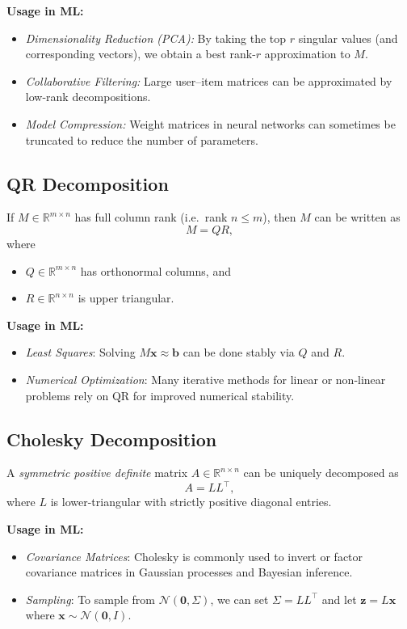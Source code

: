 \noindent
\textbf{Usage in ML:}
\begin{itemize}
    \item \emph{Dimensionality Reduction (PCA):} By taking the top $r$ singular values (and corresponding vectors), 
          we obtain a best rank-$r$ approximation to $M$.
    \item \emph{Collaborative Filtering:} Large user--item matrices can be approximated by low-rank decompositions.
    \item \emph{Model Compression:} Weight matrices in neural networks can sometimes be truncated 
          to reduce the number of parameters.
\end{itemize}

\subsection{QR Decomposition}
\begin{theorem}[QR Factorization]
If $M \in \mathbb{R}^{m \times n}$ has full column rank (i.e.\ rank $n \le m$), 
then $M$ can be written as 
\[
M = Q R,
\]
where
\begin{itemize}
    \item $Q \in \mathbb{R}^{m \times n}$ has orthonormal columns, and
    \item $R \in \mathbb{R}^{n \times n}$ is upper triangular.
\end{itemize}
\end{theorem}
\textbf{Usage in ML:}
\begin{itemize}
    \item \emph{Least Squares}: Solving $M \mathbf{x} \approx \mathbf{b}$ can be done stably via $Q$ and $R$.
    \item \emph{Numerical Optimization}: Many iterative methods for linear or non-linear problems 
          rely on QR for improved numerical stability.
\end{itemize}

\subsection{Cholesky Decomposition}
\begin{theorem}
A \emph{symmetric positive definite} matrix $A \in \mathbb{R}^{n \times n}$ can be uniquely decomposed as
\[
A = L L^\top,
\]
where $L$ is lower-triangular with strictly positive diagonal entries.
\end{theorem}
\noindent
\textbf{Usage in ML:}  
\begin{itemize}
    \item \emph{Covariance Matrices}: Cholesky is commonly used to invert or factor covariance matrices 
          in Gaussian processes and Bayesian inference.
    \item \emph{Sampling}: To sample from $\mathcal{N}(\mathbf{0}, \Sigma)$, we can set $\Sigma = L L^\top$ 
          and let $\mathbf{z} = L \mathbf{x}$ where $\mathbf{x} \sim \mathcal{N}(\mathbf{0}, I)$.
\end{itemize}

